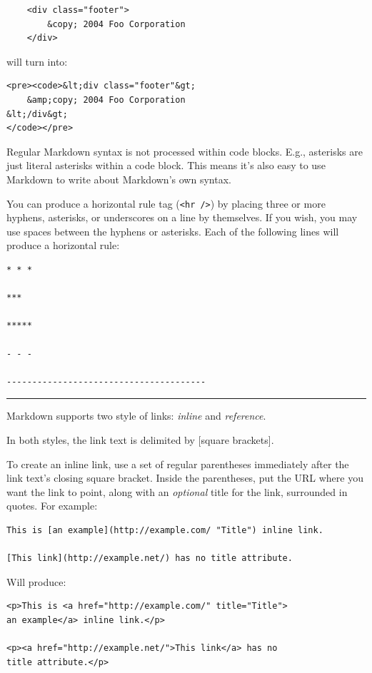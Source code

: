 \begin{verbatim}
    <div class="footer">
        &copy; 2004 Foo Corporation
    </div>
\end{verbatim}

will turn into:

\begin{verbatim}
<pre><code>&lt;div class="footer"&gt;
    &amp;copy; 2004 Foo Corporation
&lt;/div&gt;
</code></pre>
\end{verbatim}

Regular Markdown syntax is not processed within code blocks. E.g.,
asterisks are just literal asterisks within a code block. This means
it's also easy to use Markdown to write about Markdown's own syntax.

You can produce a horizontal rule tag (\texttt{<hr />}) by placing three or
more hyphens, asterisks, or underscores on a line by themselves. If you
wish, you may use spaces between the hyphens or asterisks. Each of the
following lines will produce a horizontal rule:

\begin{verbatim}
* * *

***

*****

- - -

---------------------------------------
\end{verbatim}

\begin{center}\rule{3in}{0.4pt}\end{center}

Markdown supports two style of links: \emph{inline} and \emph{reference}.

In both styles, the link text is delimited by [square brackets].

To create an inline link, use a set of regular parentheses immediately
after the link text's closing square bracket. Inside the parentheses,
put the URL where you want the link to point, along with an \emph{optional}
title for the link, surrounded in quotes. For example:

\begin{verbatim}
This is [an example](http://example.com/ "Title") inline link.

[This link](http://example.net/) has no title attribute.
\end{verbatim}

Will produce:

\begin{verbatim}
<p>This is <a href="http://example.com/" title="Title">
an example</a> inline link.</p>

<p><a href="http://example.net/">This link</a> has no
title attribute.</p>
\end{verbatim}

